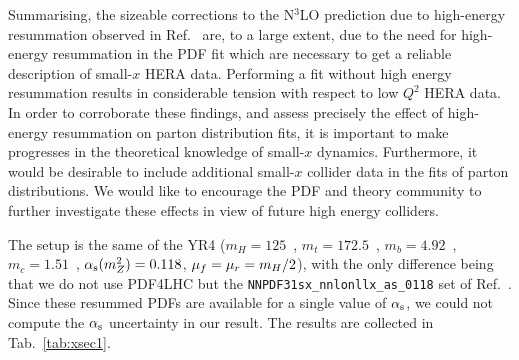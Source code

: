 Summarising, the sizeable corrections to the N$^3$LO prediction due to
high-energy resummation observed in Ref.~\cite{Bonvini:2018ixe} are,
to a large extent, due to the need for high-energy resummation in the
PDF fit which are necessary to get a reliable description of small-$x$
HERA data.  Performing a fit without high energy resummation results
in considerable tension with respect to low $Q^2$ HERA data.  In order
to corroborate these findings, and assess precisely the effect of
high-energy resummation on parton distribution fits, it is important
to make progresses in the theoretical knowledge of small-$x$
dynamics. Furthermore, it would be desirable to include additional
small-$x$ collider data in the fits of parton distributions.  We would
like to encourage the PDF and theory community to further investigate
these effects in view of future high energy colliders.




The setup is the same of the YR4 ($m_H=125$~\UGeV, $m_t=172.5$~\UGeV,
$m_b=4.92$~\UGeV, $m_c=1.51$~\UGeV, $\alpha_\text{s}(m_Z^2)=0.118$,
$\mu_f=\mu_r=m_H/2$), with the only difference being that we do not use
PDF4LHC but the 
\verb+NNPDF31sx_nnlonllx_as_0118+ set of
Ref.~\cite{Ball:2017otu}.  Since these resummed PDFs are available for
a single value of $\alpha_\text{s}$, we could not compute the $\alpha_\text{s}$ uncertainty in
our result. The results are collected in Tab.~\ref{tab:xsec1}.


